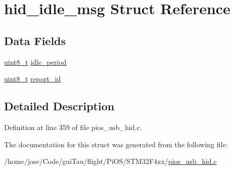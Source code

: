 \hypertarget{structhid__idle__msg}{\section{hid\-\_\-idle\-\_\-msg Struct Reference}
\label{structhid__idle__msg}
}
\subsection*{Data Fields}
\begin{DoxyCompactItemize}
\item 
\hyperlink{stdint_8h_aba7bc1797add20fe3efdf37ced1182c5}{uint8\-\_\-t} \hyperlink{group___p_i_o_s___u_s_b___h_i_d_ga6f939e967dc4622730a02a7d467edf7a}{idle\-\_\-period}
\item 
\hyperlink{stdint_8h_aba7bc1797add20fe3efdf37ced1182c5}{uint8\-\_\-t} \hyperlink{group___p_i_o_s___u_s_b___h_i_d_gae36ecdd57567fb6f4ee28b3130b3c8ee}{report\-\_\-id}
\end{DoxyCompactItemize}


\subsection{Detailed Description}


Definition at line 359 of file pios\-\_\-usb\-\_\-hid.\-c.



The documentation for this struct was generated from the following file\-:\begin{DoxyCompactItemize}
\item 
/home/jose/\-Code/gui\-Tau/flight/\-Pi\-O\-S/\-S\-T\-M32\-F4xx/\hyperlink{_s_t_m32_f4xx_2pios__usb__hid_8c}{pios\-\_\-usb\-\_\-hid.\-c}\end{DoxyCompactItemize}
